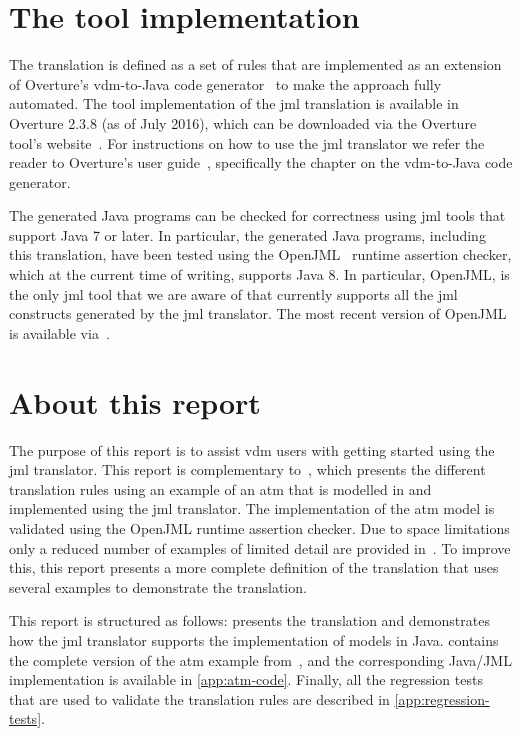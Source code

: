 \section{The tool implementation}

The translation is defined as a set of rules that are implemented as
an extension of Overture's \ac{vdm}-to-Java code
generator~\cite{Jorgensen&14a} to make the approach fully
automated. The tool implementation of the \ac{jml} translation is
available in Overture 2.3.8 (as of July 2016), which can be downloaded
via the Overture tool's website~\cite{Overture}. For
instructions on how to use the \ac{jml} translator we refer the reader
to Overture's user guide~\cite{Larsen&10d}, specifically the chapter
on the \ac{vdm}-to-Java code generator.

The generated Java programs can be checked for correctness using
\ac{jml} tools that support Java 7 or later. In particular, the
generated Java programs, including this translation, have been tested
using the OpenJML~\cite{Cok&11} runtime assertion checker, which at
the current time of writing, supports Java 8. In particular, OpenJML,
is the only \ac{jml} tool that we are aware of that currently supports
all the \ac{jml} constructs generated by the \ac{jml} translator. The
most recent version of OpenJML is available via~\cite{OpenJMLWebsite}.

\section{About this report}

The purpose of this report is to assist \ac{vdm} users with getting
started using the \ac{jml} translator. This report is complementary
to~\cite{Jorgensen&16a}, which presents the different translation
rules using an example of an \ac{atm} that is modelled in \vsl and
implemented using the \ac{jml} translator. The implementation of the
\ac{atm} model is validated using the OpenJML runtime assertion
checker. Due to space limitations only a reduced number of examples of
limited detail are provided in~\cite{Jorgensen&16a}. To improve this,
this report presents a more complete definition of the translation
that uses several examples to demonstrate the translation.

This report is structured as follows:  presents the
translation and demonstrates how the \ac{jml} translator supports the
implementation of \vsl models in Java.  contains
the complete version of the \ac{atm} example
from~\cite{Jorgensen&16a}, and the corresponding Java/JML
implementation is available in \cref{app:atm-code}. Finally, all the
regression tests that are used to validate the translation rules are
described in \cref{app:regression-tests}.

